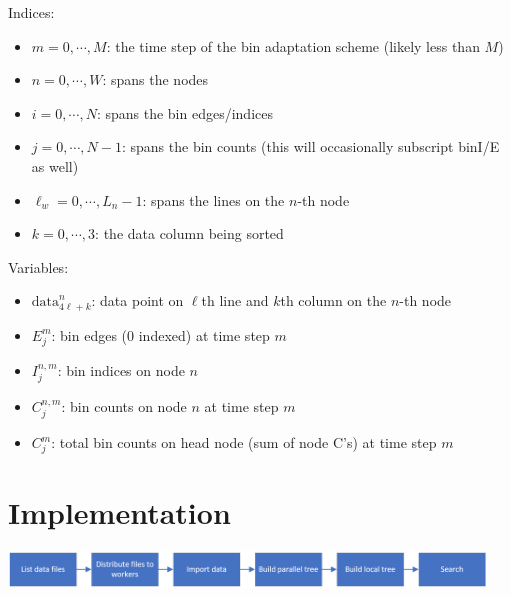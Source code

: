 \documentclass{article}
\begin{document}
\begin{mdframed}[backgroundcolor=blue!20]
	Indices:
	\setlength\itemsep{0.1pt}
	\setlength\parskip{0.1pt}
	\begin{itemize}
		\setlength\itemsep{0.1pt}
		\setlength\parskip{0.1pt}
		\item $m = 0, \cdots, M$: the time step of the bin adaptation scheme (likely less than $M$)
		\item $n = 0, \cdots, W$: spans the nodes
		\item $i = 0, \cdots, N$: spans the bin edges/indices
		\item $j = 0, \cdots, N-1$: spans the bin counts (this will occasionally subscript binI/E as well)
		\item $\ell_w = 0, \cdots, L_n-1$: spans the lines on the $n$-th node
		\item $k = 0, \cdots, 3$: the data column being sorted
	\end{itemize}
\end{mdframed}

\begin{mdframed}[backgroundcolor=blue!20]
	Variables:
	\setlength\itemsep{0.1pt}
	\setlength\parskip{0.1pt}
	\begin{itemize}
		\setlength\itemsep{0.1pt}
		\setlength\parskip{0.1pt}
		\item $\textrm{data}^n_{4\ell+k}$: data point on $\ell$th line and $k$th column on the $n$-th node
		\item ${E}^m_j$: bin edges (0 indexed) at time step $m$
		\item ${I}^{n,m}_j$: bin indices on node $n$
		\item ${C}^{n,m}_j$: bin counts on node $n$ at time step $m$
		\item ${C}^m_j$: total bin counts on head node (sum of node C's) at time step $m$
	\end{itemize}
\end{mdframed}


%
%

\section{Implementation}


\begin{center}
\includegraphics[width=0.95\textwidth]{images/flow.png}
\end{center}
\end{document}
